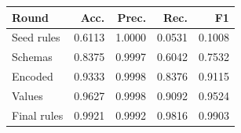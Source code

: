 \begin{tabular}{lrrrr}
\toprule
Round & Acc. & Prec. & Rec. & F1 \\
\midrule
Seed rules & 0.6113 & 1.0000 & 0.0531 & 0.1008 \\
Schemas & 0.8375 & 0.9997 & 0.6042 & 0.7532 \\
Encoded & 0.9333 & 0.9998 & 0.8376 & 0.9115 \\
Values & 0.9627 & 0.9998 & 0.9092 & 0.9524 \\
Final rules & 0.9921 & 0.9992 & 0.9816 & 0.9903 \\
\bottomrule
\end{tabular}
